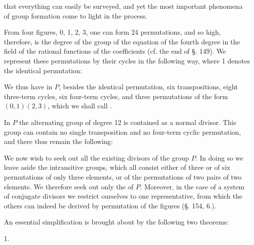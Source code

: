 that everything can easily be surveyed, and yet the most important phenomena of group formation come to light in the process.

From four figures, 0, 1, 2, 3, one can form 24 permutations, and so high, therefore, is the degree of the  group of the  equation of the fourth degree in the field of the rational functions of the coefficients (cf. the end of §. 149). We represent these permutations by their cycles in the following way, where 1 denotes the identical permutation:

We thus have in $P$, besides the identical permutation, six transpositions, eight three-term cycles, six four-term cycles, and three permutations of the form $(0,1)(2,3)$, which we shall call .

In $P$ the alternating group of degree 12 is contained as a normal divisor. This group can contain no single transposition and no four-term cyclic permutation, and there thus remain the following:

We now wish to seek out all the existing divisors of the group $P$. In doing so we leave aside the intransitive groups, which all consist either of three or of six permutations of only three elements, or of the permutations of two pairs of two elements. We therefore seek out only the  of $P$. Moreover, in the case of a system of conjugate divisors we restrict ourselves to one representative, from which the others can indeed be derived by permutation of the figures (§. 154, 6.).

An essential simplification is brought about by the following two theorems:

1. 
